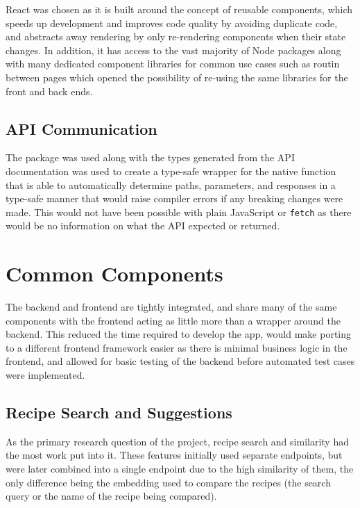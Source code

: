 React was chosen as it is built around the concept of reusable components, which speeds up development and
improves code quality by avoiding duplicate code,~\cite{hordijk_harmfulness_2009} and abstracts away rendering
by only re-rendering components when their state changes. In addition, it has access to the vast majority of
Node packages along with many dedicated component libraries for common use cases such as routin between pages
which opened the possibility of re-using the same libraries for the front and back ends.~\cite{saks_javascript_2019}

\subsection{API Communication}
The  package was used along with the types generated from the API documentation was
used to create a type-safe wrapper for the native  function that is able to automatically
determine paths, parameters, and responses in a type-safe manner that would raise compiler errors if any breaking
changes were made. This would not have been possible with plain JavaScript or \texttt{fetch} as there would be no
information on what the API expected or returned.

\section{Common Components}

The backend and frontend are tightly integrated, and share many of the same components with the frontend acting
as little more than a wrapper around the backend. This reduced the time required to develop the app, would
make porting to a different frontend framework easier as there is minimal business logic in the frontend, and
allowed for basic testing of the backend before automated test cases were implemented.

\subsection{Recipe Search and Suggestions}
As the primary research question of the project, recipe search and similarity had the most work put into it.
These features initially used separate endpoints, but were later combined into a single endpoint due to the
high similarity of them, the only difference being the embedding used to compare the recipes (the search query
or the name of the recipe being compared).

